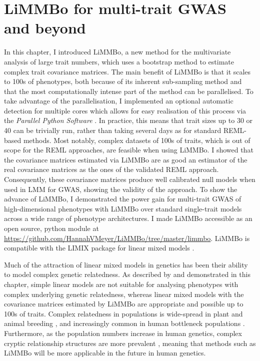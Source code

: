 \section{LiMMBo for multi-trait GWAS and beyond}
In this chapter, I introduced LiMMBo, a new method for the multivariate analysis of large trait numbers, which uses a bootstrap method to estimate complex trait covariance matrices. The main benefit of LiMMBo is that it scales to \num{100}s of phenotypes, both because of its inherent sub-sampling method and that the most computationally intense part of the method can be parallelised. To take advantage of the parallelisation, I implemented an optional automatic detection for multiple cores which allows for easy realisation of this process via the \textit{Parallel Python Software} \citep{PPSoftware}. In practice, this means that trait sizes up to 30 or 40 can be trivially run, rather than taking several days as for standard REML-based methods. Most notably, complex datasets of \num{100}s of traits, which is out of scope for the REML approaches, are feasible when using LiMMBo. I showed that the covariance matrices estimated via LiMMBo are as good an estimator of the real covariance matrices as the ones of the validated REML approach. Consequently, these covariance matrices produce well calibrated null models when used in LMM for GWAS, showing the validity of the approach. To show the advance of LiMMBo, I demonstrated the power gain for multi-trait GWAS of high-dimensional phenotypes with LiMMBo over standard single-trait models across a wide range of phenotype architectures. I made LiMMBo accessible as an open source, python module at \url{https://github.com/HannahVMeyer/LiMMBo/tree/master/limmbo}. LiMMBo is compatible with the LIMIX package for linear mixed models \citep{Lippert2014}.  

Much of the attraction of linear mixed models in genetics has been their ability to model complex genetic relatedness. As described by \citep{Kang2010} and demonstrated in this chapter, simple linear models are not suitable for analysing phenotypes with complex underlying genetic relatedness, whereas linear mixed models with the covariance matrices estimated by LiMMBo are appropriate and possible up to \num{100}s of traits. Complex relatedness in populations is wide-spread in plant and animal breeding \citep{Bolormaa2014,Yang2014}, and increasingly common in human bottleneck populations \citep{Tachmazidou2013}. Furthermore, as the population numbers increase in human genetics, complex cryptic relationship structures are more prevalent \citep{Reich2001}, meaning that methods such as LiMMBo will be more applicable in the future in human genetics. 

